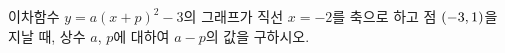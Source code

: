 이차함수 $y=a(x+p)^2-3$의 그래프가 직선 $x=-2$를 축으로 하고 점 $(-3{,}\mkern3mu 1)$을 지날 때, 상수 $a$, $p$에 대하여 $a-p$의 값을 구하시오.
